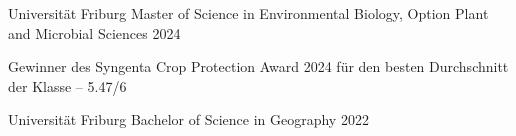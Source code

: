 

\begin{cventries}

  \cventrynoloc
    {Universität Friburg} %
    {Master of Science in Environmental Biology, Option Plant and Microbial Sciences} %
    {2024} %
    {
      \begin{cvitems} %
        \item {Gewinner des Syngenta Crop Protection Award 2024 für den besten Durchschnitt der Klasse -- 5.47/6}
      \end{cvitems}
    }

  \cventrynoloc
    {Universität Friburg} %
    {Bachelor of Science in Geography} %
    {2022} %
    {}

\end{cventries}
